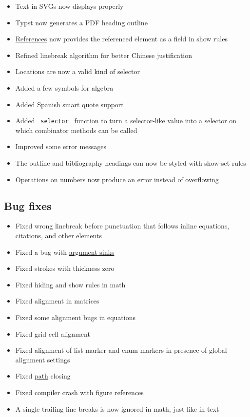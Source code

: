 \begin{itemize}
\tightlist
\item
  Text in SVGs now displays properly
\item
  Typst now generates a PDF heading outline
\item
  \href{/docs/reference/model/ref/}{References} now provides the
  referenced element as a field in show rules
\item
  Refined linebreak algorithm for better Chinese justification
\item
  Locations are now a valid kind of selector
\item
  Added a few symbols for algebra
\item
  Added Spanish smart quote support
\item
  Added
  \href{/docs/reference/foundations/selector/}{\texttt{\ selector\ }}
  function to turn a selector-like value into a selector on which
  combinator methods can be called
\item
  Improved some error messages
\item
  The outline and bibliography headings can now be styled with show-set
  rules
\item
  Operations on numbers now produce an error instead of overflowing
\end{itemize}

\subsection{Bug fixes}\label{bug-fixes}

\begin{itemize}
\tightlist
\item
  Fixed wrong linebreak before punctuation that follows inline
  equations, citations, and other elements
\item
  Fixed a bug with
  \href{/docs/reference/foundations/arguments/}{argument sinks}
\item
  Fixed strokes with thickness zero
\item
  Fixed hiding and show rules in math
\item
  Fixed alignment in matrices
\item
  Fixed some alignment bugs in equations
\item
  Fixed grid cell alignment
\item
  Fixed alignment of list marker and enum markers in presence of global
  alignment settings
\item
  Fixed \href{/docs/reference/visualize/path/}{path} closing
\item
  Fixed compiler crash with figure references
\item
  A single trailing line breaks is now ignored in math, just like in
  text
\end{itemize}


